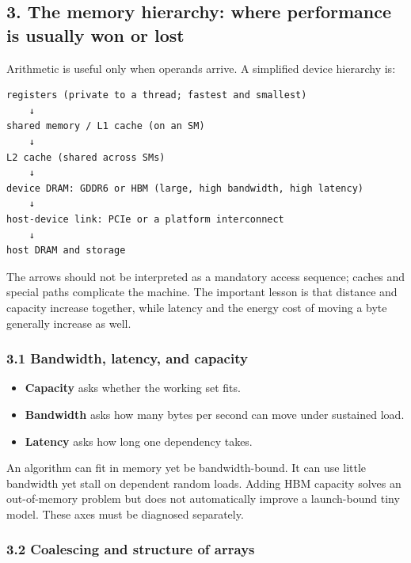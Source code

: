 \documentclass[
  10pt,
  letterpaper,
]{article}
\providecommand{\tightlist}{%
  \setlength{\itemsep}{0pt}\setlength{\parskip}{0pt}}
\begin{document}
\subsection{3. The memory hierarchy: where performance is usually won or
lost}\label{3-the-memory-hierarchy-where-performance-is-usually-won-or-lost}

Arithmetic is useful only when operands arrive. A simplified device
hierarchy is:

\begin{verbatim}
registers (private to a thread; fastest and smallest)
    ↓
shared memory / L1 cache (on an SM)
    ↓
L2 cache (shared across SMs)
    ↓
device DRAM: GDDR6 or HBM (large, high bandwidth, high latency)
    ↓
host-device link: PCIe or a platform interconnect
    ↓
host DRAM and storage
\end{verbatim}

The arrows should not be interpreted as a mandatory access sequence;
caches and special paths complicate the machine. The important lesson is
that distance and capacity increase together, while latency and the
energy cost of moving a byte generally increase as well.

\subsubsection{3.1 Bandwidth, latency, and
capacity}\label{31-bandwidth-latency-and-capacity}

\begin{itemize}
\tightlist
\item
  \textbf{Capacity} asks whether the working set fits.
\item
  \textbf{Bandwidth} asks how many bytes per second can move under
  sustained load.
\item
  \textbf{Latency} asks how long one dependency takes.
\end{itemize}

An algorithm can fit in memory yet be bandwidth-bound. It can use little
bandwidth yet stall on dependent random loads. Adding HBM capacity
solves an out-of-memory problem but does not automatically improve a
launch-bound tiny model. These axes must be diagnosed separately.

\subsubsection{3.2 Coalescing and structure of
arrays}\label{32-coalescing-and-structure-of-arrays}
\end{document}
